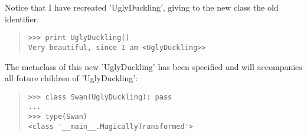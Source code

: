 \documentclass[10pt,english]{article}
\begin{document}
Notice that I have recreated 'UglyDuckling', giving to the new class
the old identifier.
\begin{quote}
\begin{verbatim}>>> print UglyDuckling()
Very beautiful, since I am <UglyDuckling>>\end{verbatim}
\end{quote}

The metaclass of this new 'UglyDuckling' has been specified and will 
accompanies all future children of 'UglyDuckling':
\begin{quote}
\begin{verbatim}>>> class Swan(UglyDuckling): pass
...
>>> type(Swan)
<class '__main__.MagicallyTransformed'>\end{verbatim}
\end{quote}
\end{document}
